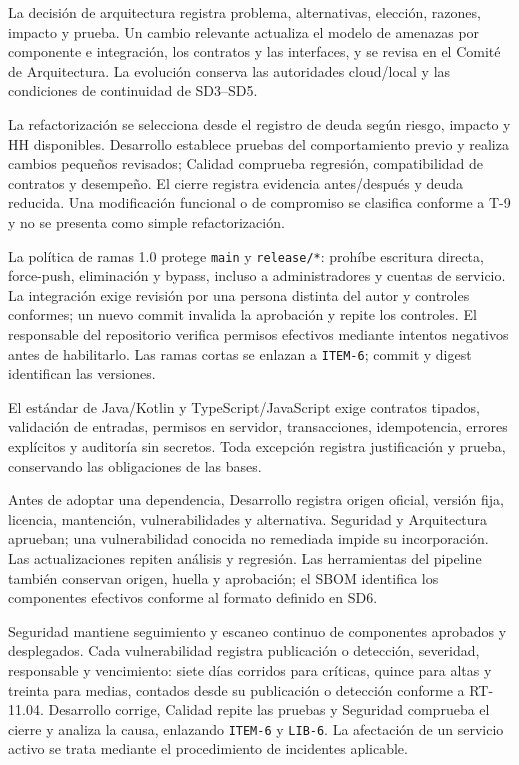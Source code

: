 La decisión de arquitectura registra problema, alternativas, elección, razones, impacto y prueba. Un cambio relevante actualiza el modelo de amenazas por componente e integración, los contratos y las interfaces, y se revisa en el Comité de Arquitectura. La evolución conserva las autoridades cloud/local y las condiciones de continuidad de SD3--SD5. \parencites[RT-11.02, p.~23]{sd6-bt}[PW.1/PW.2, tabla~1]{sd6-ssdf}

La refactorización se selecciona desde el registro de deuda según riesgo, impacto y HH disponibles. Desarrollo establece pruebas del comportamiento previo y realiza cambios pequeños revisados; Calidad comprueba regresión, compatibilidad de contratos y desempeño. El cierre registra evidencia antes/después y deuda reducida. Una modificación funcional o de compromiso se clasifica conforme a T-9 y no se presenta como simple refactorización.

La política de ramas 1.0 protege \texttt{main} y \texttt{release/*}: prohíbe escritura directa, force-push, eliminación y bypass, incluso a administradores y cuentas de servicio. La integración exige revisión por una persona distinta del autor y controles conformes; un nuevo commit invalida la aprobación y repite los controles. El responsable del repositorio verifica permisos efectivos mediante intentos negativos antes de habilitarlo. Las ramas cortas se enlazan a \texttt{ITEM-6}; commit y digest identifican las versiones. \parencites[RT-04.03/04, p.~10]{sd6-bt}[PS.1; PW.5/PW.7, tabla~1]{sd6-ssdf}

El estándar de Java/Kotlin y TypeScript/JavaScript exige contratos tipados, validación de entradas, permisos en servidor, transacciones, idempotencia, errores explícitos y auditoría sin secretos. Toda excepción registra justificación y prueba, conservando las obligaciones de las bases.

Antes de adoptar una dependencia, Desarrollo registra origen oficial, versión fija, licencia, mantención, vulnerabilidades y alternativa. Seguridad y Arquitectura aprueban; una vulnerabilidad conocida no remediada impide su incorporación. Las actualizaciones repiten análisis y regresión. Las herramientas del pipeline también conservan origen, huella y aprobación; el SBOM identifica los componentes efectivos conforme al formato definido en SD6. \parencites[RT-11.23/26, p.~24]{sd6-bt}[PW.4, tabla~1]{sd6-ssdf}

Seguridad mantiene seguimiento y escaneo continuo de componentes aprobados y desplegados. Cada vulnerabilidad registra publicación o detección, severidad, responsable y vencimiento: siete días corridos para críticas, quince para altas y treinta para medias, contados desde su publicación o detección conforme a RT-11.04. Desarrollo corrige, Calidad repite las pruebas y Seguridad comprueba el cierre y analiza la causa, enlazando \texttt{ITEM-6} y \texttt{LIB-6}. La afectación de un servicio activo se trata mediante el procedimiento de incidentes aplicable. \parencites[RT-11.04, p.~23]{sd6-bt}[RV.1--RV.3, tabla~1]{sd6-ssdf}

